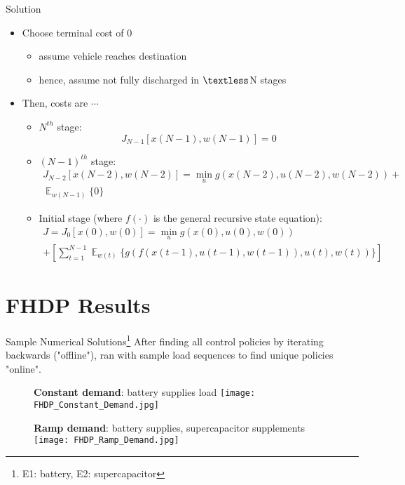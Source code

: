 \documentclass{beamer}
\DeclareMathOperator{\E}{\mathbb{E}}
\begin{document}
\begin{frame}{Solution}
\begin{itemize}
\item Choose terminal cost of 0
\begin{itemize}
\item assume vehicle reaches destination
\item hence, assume not fully discharged in $\textless$N stages
\end{itemize}
\item Then, costs are $\cdots$
\begin{itemize}
\item $N^{th}$ stage:
\begin{equation}
J_{N-1}[x(N-1),w(N-1)]=0
\end{equation}		
\item $(N-1)^{th}$ stage: \\
\begin{multline}
J_{N-2}[x(N-2),w(N-2)]=\min_{u} g(x(N-2),u(N-2),w(N-2))+\\ \mathop{\E}_{w(N-1)}\{0\}
\end{multline}
\item Initial stage (where $f(\cdot)$ is the general recursive state equation): \\	
\begin{multline}
J=J_{0}[x(0),w(0)]=\min_{u} g(x(0),u(0),w(0))\\
+\left[\sum_{t=1}^{N-1}\mathop{\E}_{w(t)} \{
g( f(x(t-1),u(t-1),w(t-1)) ,u(t),w(t))
\}\right]
\end{multline}
\end{itemize}
\end{itemize}
\end{frame}

\section{FHDP Results}
\begin{frame}{Sample Numerical Solutions\footnote{E1: battery, E2: supercapacitor}}
After finding all control policies by iterating backwards ("offline"), ran with sample load sequences to find unique policies "online".\newline\newline

\begin{minipage}{0.5\textwidth}
\begin{figure}
\textbf{Constant demand}: battery supplies load
\texttt{[image: FHDP\_Constant\_Demand.jpg]}
\end{figure}
\end{minipage}\begin{minipage}{0.5\textwidth}
\begin{figure}
\textbf{Ramp demand}: battery supplies, supercapacitor supplements
\texttt{[image: FHDP\_Ramp\_Demand.jpg]}
\end{figure}
\end{minipage}

\end{frame}
\end{document}
